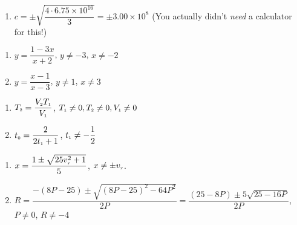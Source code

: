 \documentclass{ximera}
\begin{document}
\begin{enumerate}
\setcounter{enumi}{\value{HW}}
\item $c = \pm \sqrt{\dfrac{4 \cdot 6.75 \times 10^{16}}{3}} = \pm 3.00 \times 10^{8}$ (You actually didn't 
\textit{need} a calculator for this!)

\setcounter{HW}{\value{enumi}}
\end{enumerate}


\begin{multicols}{2}
\begin{enumerate}
\setcounter{enumi}{\value{HW}}


\item $y = \dfrac{1 - 3x}{x+2}$, $y \neq -3$, $x \neq -2$

\item $y = \dfrac{x-1}{x-3}$, $y \neq 1$, $x \neq 3$

\setcounter{HW}{\value{enumi}}
\end{enumerate}
\end{multicols}



\begin{multicols}{2}
\begin{enumerate}
\setcounter{enumi}{\value{HW}}

\item $T_{\text{\tiny $2$}} = \dfrac{V_{\text{\tiny $2$}}T_{\text{\tiny $1$}}}{V_{\text{\tiny $1$}}}$, $T_{\text{\tiny $1$}} \neq 0, T_{\text{\tiny $2$}} \neq 0, V_{\text{\tiny $1$}} \neq 0$


\item  $t_{\text{\tiny $0$}} = \dfrac{2}{2t_{\text{\tiny $1$}} + 1}$, $t_{\text{\tiny $1$}} \neq -\dfrac{1}{2}$

\setcounter{HW}{\value{enumi}}
\end{enumerate}
\end{multicols}

\begin{enumerate}
\setcounter{enumi}{\value{HW}}


\item  $x = \dfrac{1 \pm \sqrt{25v_{\text{\tiny $r$}}^2+1}}{5}$, $x \neq \pm v_{\text{\tiny $r$}}$.

\item $R= \dfrac{-(8P-25) \pm \sqrt{(8P-25)^2 - 64P^2}}{2P} = \dfrac{(25-8P) \pm 5 \sqrt{25-16P}}{2P}$, $P \neq 0$, $R \neq -4$

\setcounter{HW}{\value{enumi}}
\end{enumerate}
\end{document}
